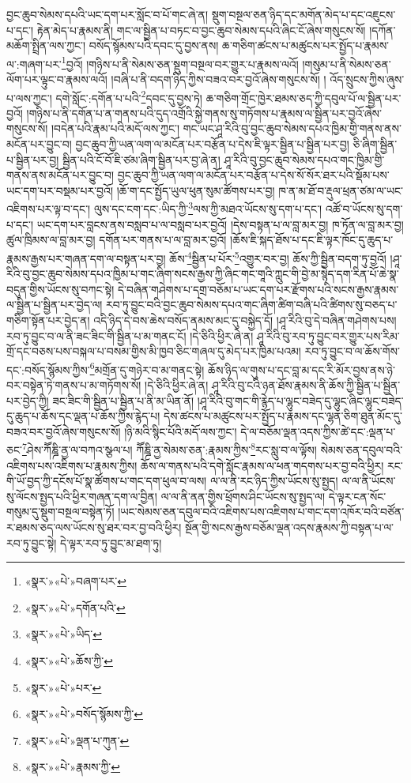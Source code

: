 བྱང་ཆུབ་སེམས་དཔའི་ཡང་དག་པར་སློང་བ་པོ་གང་ཞེ་ན། སྡུག་བསྔལ་ཅན་ཉིད་དང་མགོན་མེད་པ་དང་འཇུངས་པ་དང་། རྟེན་མེད་པ་རྣམས་ནི། གང་ལ་སྦྱིན་པ་བཏང་བ་བྱང་ཆུབ་སེམས་དཔའི་ཞིང་ངོ་ཞེས་གསུངས་སོ། །དཀོན་མཆོག་སྤྲིན་ལས་ཀྱང་། བསོད་སྙོམས་པའི་དབང་དུ་བྱས་ནས། ཆ་གཅིག་ཚངས་པ་མཚུངས་པར་སྤྱོད་པ་རྣམས་ལ་:གཞག་པར་\footnote{«སྣར་»«པེ་»བཞག་པར་}བྱའོ། །གཉིས་པ་ནི་སེམས་ཅན་སྡུག་བསྔལ་བར་གྱུར་པ་རྣམས་ལའོ། །གསུམ་པ་ནི་སེམས་ཅན་ལོག་པར་ལྟུང་བ་རྣམས་ལའོ། །བཞི་པ་ནི་བདག་ཉིད་ཀྱིས་བཟའ་བར་བྱའོ་ཞེས་གསུངས་སོ། །
འོད་སྲུངས་ཀྱིས་ཞུས་པ་ལས་ཀྱང་། དགེ་སློང་:དགོན་པ་པའི་\footnote{«སྣར་»«པེ་»དགོན་པའི་}དབང་དུ་བྱས་ཏེ། ཆ་གཅིག་གྲོང་ཁྱེར་ཐམས་ཅད་ཀྱི་དབུལ་པོ་ལ་སྦྱིན་པར་བྱའོ། །གཉིས་པ་ནི་དགོན་པ་ན་གནས་པའི་དུད་འགྲོའི་སྐྱེ་གནས་སུ་གཏོགས་པ་རྣམས་ལ་སྦྱིན་པར་བྱའོ་ཞེས་གསུངས་སོ། །བདེན་པའི་རྣམ་པའི་མདོ་ལས་ཀྱང་། གང་ཡང་ཤཱ་རིའི་བུ་བྱང་ཆུབ་སེམས་དཔའ་ཁྱིམ་གྱི་གནས་ནས་མངོན་པར་བྱུང་བ། བྱང་ཆུབ་ཀྱི་ཡན་ལག་ལ་མངོན་པར་བརྩོན་པ་དེས་ཇི་ལྟར་སྦྱིན་པ་སྦྱིན་པར་བྱ། ཅི་ཞིག་སྦྱིན་པ་སྦྱིན་པར་བྱ། སྦྱིན་པའི་ངོ་བོ་ཇི་ཙམ་ཞིག་སྦྱིན་པར་བྱ་ཞེ་ན། ཤཱ་རིའི་བུ་བྱང་ཆུབ་སེམས་དཔའ་གང་ཁྱིམ་གྱི་གནས་ནས་མངོན་པར་བྱུང་བ། བྱང་ཆུབ་ཀྱི་ཡན་ལག་ལ་མངོན་པར་བརྩོན་པ་དེས་སོ་སོར་ཐར་པའི་སྡོམ་པས་ཡང་དག་པར་བསྡམ་པར་བྱའོ། །ཆོ་ག་དང་སྤྱོད་ཡུལ་ཕུན་སུམ་ཚོགས་པར་བྱ། ཁ་ན་མ་ཐོ་བ་རྡུལ་ཕྲན་ཙམ་ལ་ཡང་འཇིགས་པར་ལྟ་བ་དང་། ལུས་དང་ངག་དང་:ཡིད་ཀྱི་\footnote{«སྣར་»«པེ་»ཡིད་}ལས་ཀྱི་མཐའ་ཡོངས་སུ་དག་པ་དང་། འཚོ་བ་ཡོངས་སུ་དག་པ་དང་། ཡང་དག་པར་བླངས་ནས་བསླབ་པ་ལ་བསླབ་པར་བྱའོ། །དེས་བསྟན་པ་ལ་བླ་མར་བྱ། ཁ་ཏོན་ལ་བླ་མར་བྱ། ཚུལ་ཁྲིམས་ལ་བླ་མར་བྱ། དགོན་པར་གནས་པ་ལ་བླ་མར་བྱའོ། །ཆོས་ཇི་སྐད་ཐོས་པ་དང་ཇི་ལྟར་ཁོང་དུ་ཆུད་པ་རྣམས་རྒྱས་པར་གཞན་དག་ལ་བསྟན་པར་བྱ། ཆོས་\footnote{«སྣར་»«པེ་»ཆོས་ཀྱི་}སྦྱིན་པ་པོར་\footnote{«སྣར་»«པེ་»པར་}འགྱུར་བར་བྱ། ཆོས་ཀྱི་སྦྱིན་བདག་ཏུ་བྱའོ། །ཤཱ་རིའི་བུ་བྱང་ཆུབ་སེམས་དཔའ་ཁྱིམ་པ་གང་ཞིག་སངས་རྒྱས་ཀྱི་ཞིང་གང་གཱའི་ཀླུང་གི་བྱེ་མ་སྙེད་དག་རིན་པོ་ཆེ་སྣ་བདུན་གྱིས་ཡོངས་སུ་བཀང་སྟེ། དེ་བཞིན་གཤེགས་པ་དགྲ་བཅོམ་པ་ཡང་དག་པར་རྫོགས་པའི་སངས་རྒྱས་རྣམས་ལ་སྦྱིན་པ་སྦྱིན་པར་བྱེད་ལ། རབ་ཏུ་བྱུང་བའི་བྱང་ཆུབ་སེམས་དཔའ་གང་ཞིག་ཚིག་བཞི་པའི་ཚིགས་སུ་བཅད་པ་གཅིག་སྟོན་པར་བྱེད་ན། འདི་ཉིད་དེ་བས་ཆེས་བསོད་ནམས་མང་དུ་བསྐྱེད་དོ། །ཤཱ་རིའི་བུ་དེ་བཞིན་གཤེགས་པས། རབ་ཏུ་བྱུང་བ་ལ་ནི་ཟང་ཟིང་གི་སྦྱིན་པ་མ་གནང་ངོ། །དེ་ཅིའི་ཕྱིར་ཞེ་ན། ཤཱ་རིའི་བུ་རབ་ཏུ་བྱུང་བར་གྱུར་པས་རིམ་གྲོ་དང་བཅས་པས་བསྐལ་པ་བསམ་གྱིས་མི་ཁྱབ་ཅིང་གཞལ་དུ་མེད་པར་ཁྱིམ་པའམ། རབ་ཏུ་བྱུང་བ་ལ་ཆོས་གོས་དང་:བསོད་སྙོམས་ཀྱིས་\footnote{«སྣར་»«པེ་»བསོད་སྙོམས་ཀྱི་}མགྲོན་དུ་གཉེར་བ་མ་གནང་སྟེ། ཆོས་ཉིད་ལ་གུས་པ་དང་བླ་མ་དང་རི་མོར་བྱས་ནས་ཉེ་བར་བསྟེན་ཏེ་གནས་པ་མ་གཏོགས་སོ། །དེ་ཅིའི་ཕྱིར་ཞེ་ན། ཤཱ་རིའི་བུ་ངའི་ཉན་ཐོས་རྣམས་ནི་ཆོས་ཀྱི་སྦྱིན་པ་སྦྱིན་པར་བྱེད་ཀྱི། ཟང་ཟིང་གི་སྦྱིན་པ་སྦྱིན་པ་ནི་མ་ཡིན་ནོ། །ཤཱ་རིའི་བུ་གང་གི་རྙེད་པ་ལྷུང་བཟེད་དུ་ལྷུང་ཞིང་ལྷུང་བཟེད་དུ་ཆུད་པ་ཆོས་དང་ལྡན་པ་ཆོས་ཀྱིས་རྙེད་པ། དེས་ཚངས་པ་མཚུངས་པར་སྤྱོད་པ་རྣམས་དང་ལྷན་ཅིག་ཐུན་མོང་དུ་བཟའ་བར་བྱའོ་ཞེས་གསུངས་སོ། །ཉི་མའི་སྙིང་པོའི་མདོ་ལས་ཀྱང་། དེ་ལ་བཅོམ་ལྡན་འདས་ཀྱིས་ཚེ་དང་:ལྡན་པ་ཅང་\footnote{«སྣར་»«པེ་»ལྡན་པ་ཀུན་}ཤེས་ཀཽཎྜི་ནྱ་ལ་བཀའ་སྩལ་པ། ཀཽཎྜི་ནྱ་སེམས་ཅན་:རྣམས་ཀྱིས་\footnote{«སྣར་»«པེ་»རྣམས་ཀྱི་}རང་སླུ་བ་ལ་ལྟོས། སེམས་ཅན་དབུལ་བའི་འཇིགས་པས་འཇིགས་པ་རྣམས་ཀྱིས། ཆོས་ལ་གནས་པའི་དགེ་སློང་རྣམས་ལ་ཕན་གདགས་པར་བྱ་བའི་ཕྱིར། རང་གི་ཡོ་བྱད་ཀྱི་དངོས་པོ་སྣ་ཚོགས་པ་གང་དག་ཕུལ་བ་ལས། ལ་ལ་ནི་རང་ཉིད་ཀྱིས་ཡོངས་སུ་སྤྱད། ལ་ལ་ནི་ཡོངས་སུ་ལོངས་སྤྱད་པའི་ཕྱིར་གཞན་དག་ལ་བྱིན། ལ་ལ་ནི་ནན་གྱིས་ཕྲོགས་ཤིང་ཡོངས་སུ་སྤྱད་ལ། དེ་ལྟར་ངན་སོང་གསུམ་དུ་སྡུག་བསྔལ་བསྟེན་ཏོ། །ཡང་སེམས་ཅན་དབུལ་བའི་འཇིགས་པས་འཇིགས་པ་གང་དག་འཁོར་བའི་བཙོན་ར་ཐམས་ཅད་ལས་ཡོངས་སུ་ཐར་བར་བྱ་བའི་ཕྱིར། སྔོན་གྱི་སངས་རྒྱས་བཅོམ་ལྡན་འདས་རྣམས་ཀྱི་བསྟན་པ་ལ་རབ་ཏུ་བྱུང་སྟེ། དེ་ལྟར་རབ་ཏུ་བྱུང་མ་ཐག་ཏུ། 